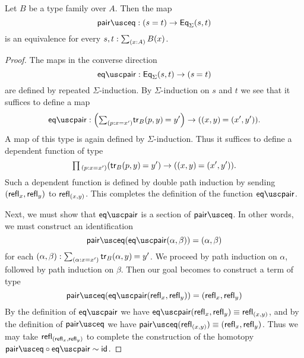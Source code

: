 \begin{thm}\label{thm:eq_sigma}
  Let $B$ be a type family over $A$. Then the map
  \begin{equation*}
    \paireq: (s=t)\to \EqSigma(s,t)
  \end{equation*}
  is an equivalence for every $s,t:\sm{x:A}B(x)$.
\end{thm}

\begin{proof}
The maps in the converse direction
\begin{equation*}
\eqpair : \EqSigma(s,t)\to(\id{s}{t})
\end{equation*}
are defined by repeated $\Sigma$-induction. By $\Sigma$-induction on $s$ and $t$  we see that it suffices to define a map
\begin{equation*}
\eqpair : \Big(\sm{p:x=x'}\id{\tr_B(p,y)}{y'}\Big)\to(\id{(x,y)}{(x',y')}).
\end{equation*}
A map of this type is again defined by $\Sigma$-induction. Thus it suffices to define a dependent function of type
\begin{equation*}
\prd{p:x=x'} (\id{\tr_B(p,y)}{y'}) \to (\id{(x,y)}{(x',y')}).
\end{equation*}
Such a dependent function is defined by double path induction by sending ${\mathopen{}(\mathsf{refl}_{x},\mathsf{refl}_{y})\mathclose{}}$ to $\mathsf{refl}_{{\mathopen{}(x,y)\mathclose{}}}$. This completes the definition of the function $\eqpair$.

Next, we must show that $\eqpair$ is a section of $\paireq$. In other words, we must construct an identification
\begin{equation*}
\paireq(\eqpair(\alpha,\beta))=\pairr{\alpha,\beta}
\end{equation*}
for each $\pairr{\alpha,\beta}:\sm{\alpha:x=x'}\id{\tr_B(\alpha,y)}{y'}$. We proceed by path induction on $\alpha$, followed by path induction on $\beta$. Then our goal becomes to construct a term of type
\begin{equation*}
\paireq(\eqpair\pairr{\refl{x},\refl{y}})=\pairr{\refl{x},\refl{y}}
\end{equation*}
By the definition of $\eqpair$ we have $\eqpair\pairr{\refl{x},\refl{y}}\jdeq \refl{\pairr{x,y}}$, and by the definition of $\paireq$ we have $\paireq(\refl{\pairr{x,y}})\jdeq\pairr{\refl{x},\refl{y}}$. Thus we may take $\mathsf{refl}_{{\mathopen{}(\mathsf{refl}_{x},\mathsf{refl}_{y})\mathclose{}}}$ to complete the construction of the homotopy $\paireq\circ\eqpair\htpy\idfunc$.


\end{proof}
